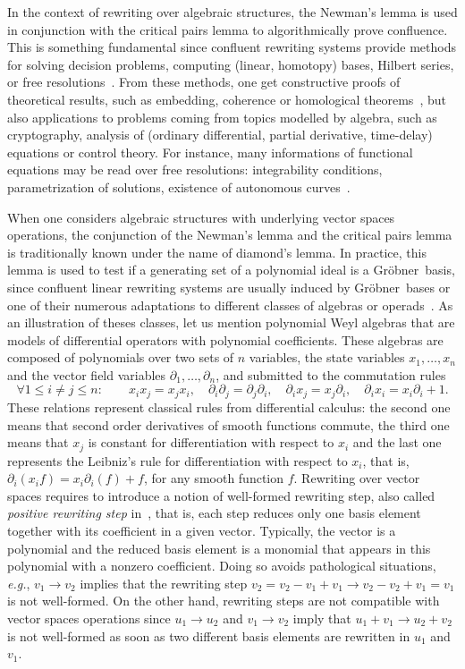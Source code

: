 \documentclass[11pt]{article}
\theoremstyle{definition}
\newcommand\eg{\emph{e.g.}}
\newcommand\G{Gröbner}
\begin{document}
In the context of rewriting over algebraic structures, the Newman's lemma
is used in conjunction with the critical pairs lemma to algorithmically
prove confluence. This is something fundamental since confluent rewriting
systems provide methods for solving decision problems, computing (linear,
homotopy) bases, Hilbert series, or free
resolutions~\cite{MR846601, GuiraudHoffbeckMalbos19, MR2964639,
  MR1072284, MR1360005}. From these methods, one get constructive proofs
of theoretical results, such as  embedding, coherence or homological
theorems~\cite{MR506890, MR0506423, MR3347996, MR3742562, MR265437,
  MR920522}, but also applications to problems coming from topics
modelled by algebra, such as cryptography, analysis of (ordinary
differential, partial derivative, time-delay) equations or control
theory. For instance, many informations of functional equations may be
read over free resolutions: integrability conditions, parametrization of
solutions, existence of autonomous curves~\cite{MR2233761, MR1308976}.
\medskip

When one considers algebraic structures with underlying vector spaces
operations, the conjunction of the Newman's lemma and the critical pairs
lemma is traditionally known under the name of diamond's lemma. In
practice, this lemma is used to test if a generating set of a polynomial
ideal is a \G\ basis, since confluent linear rewriting systems are
usually induced by \G\ bases or one of their numerous adaptations to
different classes of algebras or operads~\cite{MR506890, MR2202562,
  MR2667136, MR1044911, MR1299371}. As an illustration of theses classes,
let us mention polynomial Weyl algebras that are models of differential
operators with polynomial coefficients. These algebras are composed of
polynomials over two sets of $n$ variables, the state variables
$x_1,\ldots,x_n$ and the vector field variables
$\partial_1,\ldots,\partial_n$, and submitted to the commutation rules
\[ \forall 1\leq i\neq j\leq n: \qquad x_ix_j=x_jx_i,
\quad \partial_i\partial_j=\partial_j\partial_i, \quad \partial_ix_j=
x_j\partial_i, \quad\partial_ix_i=x_i\partial_i+1. \]
These relations represent classical rules from differential calculus: the
second one means that second order derivatives of smooth functions
commute, the third one means that $x_j$ is constant for differentiation
with respect to $x_i$ and the last one represents the Leibniz's rule for
differentiation with respect to $x_i$, that is,
$\partial_i(x_if)=x_i\partial_i(f)+f$, for any smooth function $f$.
Rewriting over vector spaces requires to introduce a notion of
well-formed rewriting step, also called {\em positive rewriting step}
in~\cite{GuiraudHoffbeckMalbos19}, that is, each step reduces only one
basis element together with its coefficient in a given vector. Typically,
the vector is a polynomial and the reduced basis element is a monomial
that appears in this polynomial with a nonzero coefficient. Doing so
avoids pathological situations, \eg, $v_1\to v_2$ implies that the
rewriting step $v_2=v_2-v_1+v_1\to v_2-v_2+v_1=v_1$ is not well-formed.
On the other hand, rewriting steps are not compatible with vector spaces
operations since $u_1\to u_2$ and $v_1\to v_2$ imply that
$u_1+v_1\to u_2+v_2$ is not well-formed as soon as two different basis
elements are rewritten in $u_1$ and $v_1$.
\medskip
\end{document}
